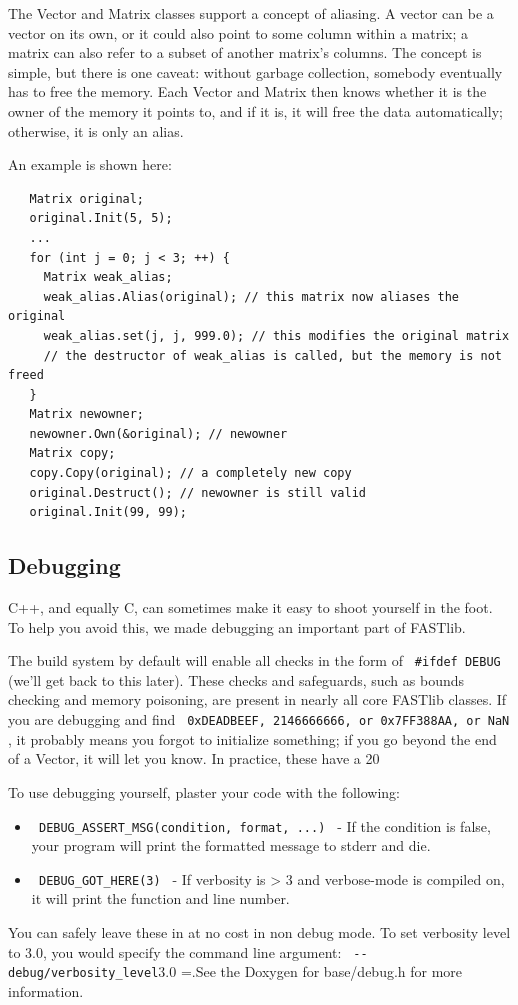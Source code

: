 \documentclass[letter]{report}
\begin{document}
The Vector and Matrix classes support a concept of aliasing. A vector can be a vector on its own, or it could also point to some column within a matrix; a matrix can also refer to a subset of another matrix's columns. The concept is simple, but there is one caveat: without garbage collection, somebody eventually has to free the memory. Each Vector and Matrix then knows whether it is the owner of the memory it points to, and if it is, it will free the data automatically; otherwise, it is only an alias.

An example is shown here:
\begin{verbatim}
   Matrix original;
   original.Init(5, 5);
   ...
   for (int j = 0; j < 3; ++) {
     Matrix weak_alias;
     weak_alias.Alias(original); // this matrix now aliases the original
     weak_alias.set(j, j, 999.0); // this modifies the original matrix
     // the destructor of weak_alias is called, but the memory is not freed
   }
   Matrix newowner;
   newowner.Own(&original); // newowner
   Matrix copy;
   copy.Copy(original); // a completely new copy 
   original.Destruct(); // newowner is still valid
   original.Init(99, 99);
\end{verbatim}

\subsection{Debugging}

C++, and equally C, can sometimes make it easy to shoot yourself in the foot. To help you avoid this, we made debugging an important part of FASTlib.

The build system by default will enable all checks in the form of \verb= #ifdef DEBUG = (we'll get back to this later). These checks and safeguards, such as bounds checking and memory poisoning, are present in nearly all core FASTlib classes. If you are debugging and find \verb= 0xDEADBEEF, 2146666666, or 0x7FF388AA, or NaN =, it probably means you forgot to initialize something; if you go beyond the end of a Vector, it will let you know. In practice, these have a 20%

To use debugging yourself, plaster your code with the following:
\begin{itemize}
\item \verb= DEBUG_ASSERT_MSG(condition, format, ...) = - If the condition is false, your program will print the formatted message to stderr and die.
\item \verb= DEBUG_GOT_HERE(3) = - If verbosity is > 3 and verbose-mode is compiled on, it will print the function and line number. 
\end{itemize}
You can safely leave these in at no cost in non debug mode. To set verbosity level to 3.0, you would specify the command line argument: \verb= --debug/verbosity_level=3.0 =.See the Doxygen for base/debug.h for more information.
\end{document}
